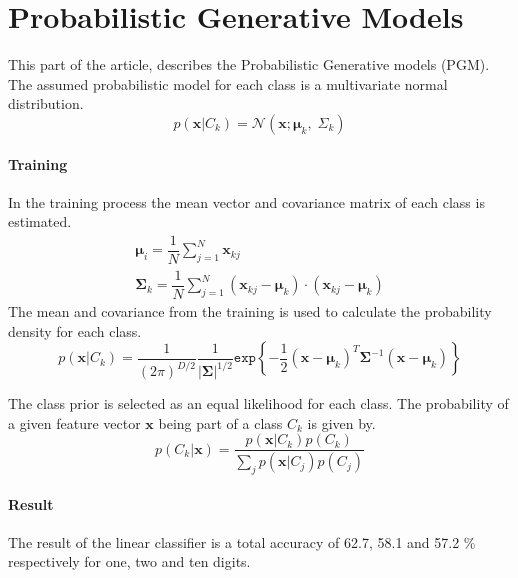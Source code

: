 \section*{Probabilistic Generative Models}
This part of the article, describes the Probabilistic Generative models (PGM).
The assumed probabilistic model for each class is a multivariate normal distribution. 
\begin{equation}
p(\mathbf{x}|C_k)=
\mathcal{N}(\mathbf{x};\mathbf{\mu}_k, \; \Sigma_k) 
\label{eq:gauss_dist} 
\end{equation}

\paragraph*{Training}
In the training process the mean vector and covariance matrix of each class is estimated.
\begin{eqnarray}
\bm{\mu}_i= \dfrac{1}{N} \sum_{j=1}^{N} \mathbf{x}_{kj} \\
\bm{\Sigma}_k =\dfrac{1}{N} \sum_{j=1}^{N} (\mathbf{x}_{kj}-\bm{\mu}_k) \cdot (\mathbf{x}_{kj}-\bm{\mu}_k)
\end{eqnarray}
The mean and covariance from the training is used to calculate the probability density for each class.
\begin{equation}
p(\mathbf{x}|C_k)=  
\dfrac{1}{(2\pi)^{D/2}} \dfrac{1}{\left|\mathbf{\Sigma} \right|^{1/2}} 
\mathtt{exp} \left\lbrace -\dfrac{1}{2} (\mathbf{x}-\mathbf{\mu}_k)^T \mathbf{\Sigma}^{-1} (\mathbf{x}-\mathbf{\mu}_k) \right\rbrace
\end{equation}

The class prior is selected as an equal likelihood for each class. The probability of a given feature vector $ \mathbf{x} $ being part of a class $ C_k $ is given by.
\begin{equation}
p(C_k |\mathbf{x}) =
\dfrac{p(\mathbf{x}|C_k) p(C_k)}
{\sum_j p(\mathbf{x}|C_j) p(C_j)}
\end{equation}

\paragraph*{Result}
The result of the linear classifier is a total accuracy of 62.7, 58.1 and 57.2 \% respectively for one, two and ten digits. 